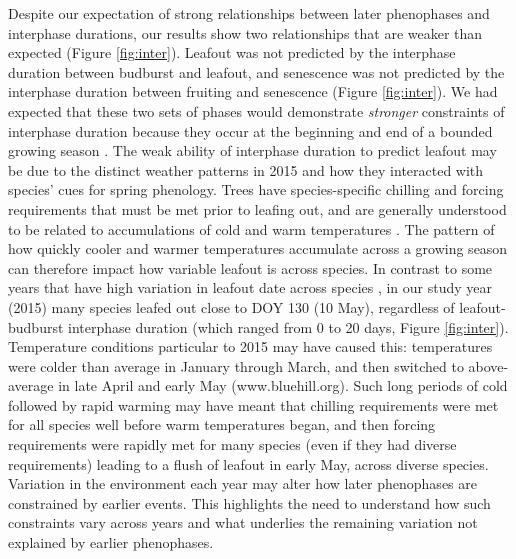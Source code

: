 \documentclass{article}
\begin{document}
\par Despite our expectation of strong relationships between later phenophases and interphase durations, our results show two relationships that are weaker than expected (Figure \ref{fig:inter}). Leafout was not predicted by the interphase duration between budburst and leafout, and senescence was not predicted by the interphase duration between fruiting and senescence (Figure \ref{fig:inter}). We had expected that these two sets of phases would demonstrate \textit{stronger} constraints of interphase duration because they occur at the beginning and end of a bounded growing season \citep{letten2013}. The weak ability of interphase duration to predict leafout may be due to the distinct weather patterns in 2015 and how they interacted with species' cues for spring phenology. Trees have species-specific chilling and forcing requirements that must be met prior to leafing out, and are generally understood to be related to accumulations of cold and warm temperatures \citep[e.g.,][]{schwartz2010,chuine2010,clark2014b}. The pattern of how quickly cooler and warmer temperatures accumulate across a growing season can therefore impact how variable leafout is across species. In contrast to some years that have high variation in leafout date across species \citep{lechowicz1995}, in our study year (2015) many species leafed out close to DOY 130 (10 May), regardless of leafout-budburst interphase duration (which ranged from 0 to 20 days, Figure \ref{fig:inter}). Temperature conditions particular to 2015 may have caused this: temperatures were colder than average in January through March, and then switched to above-average in late April and early May (www.bluehill.org). Such long periods of cold followed by rapid warming may have meant that chilling requirements were met for all species well before warm temperatures began, and then forcing requirements were rapidly met for many species (even if they had diverse requirements) leading to a flush of leafout in early May, across diverse species. Variation in the environment each year may alter how later phenophases are constrained by earlier events. This highlights the need to understand how such constraints vary across years and what underlies the remaining variation not explained by earlier phenophases.
\end{document}

